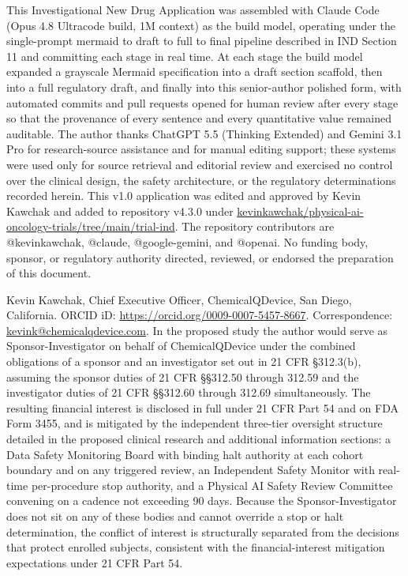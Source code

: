 This Investigational New Drug Application was assembled with Claude Code (Opus 4.8
Ultracode build, 1M context) as the build model, operating under the single-prompt
mermaid to draft to full to final pipeline described in IND Section 11 and committing
each stage in real time. At each stage the build model expanded a grayscale Mermaid
specification into a draft section scaffold, then into a full regulatory draft, and
finally into this senior-author polished form, with automated commits and pull
requests opened for human review after every stage so that the provenance of every
sentence and every quantitative value remained auditable. The author thanks
ChatGPT 5.5 (Thinking Extended) and Gemini 3.1 Pro for research-source assistance
and for manual editing support; these systems were used only for source retrieval
and editorial review and exercised no control over the clinical design, the safety
architecture, or the regulatory determinations recorded herein. This v1.0
application was edited and approved by Kevin Kawchak and added to repository
v4.3.0 under
\href{https://github.com/kevinkawchak/physical-ai-oncology-trials/tree/main/trial-ind}{kevinkawchak/physical-ai-oncology-trials/tree/main/trial-ind}.
The repository contributors are @kevinkawchak, @claude, @google-gemini, and
@openai. No funding body, sponsor, or regulatory authority directed, reviewed, or
endorsed the preparation of this document.

Kevin Kawchak, Chief Executive Officer, ChemicalQDevice, San Diego, California.
ORCID iD:
\href{https://orcid.org/0009-0007-5457-8667}{https://orcid.org/0009-0007-5457-8667}.
Correspondence: \href{mailto:kevink@chemicalqdevice.com}{kevink@chemicalqdevice.com}.
In the proposed study the author would serve as Sponsor-Investigator on behalf of
ChemicalQDevice under the combined obligations of a sponsor and an investigator set
out in 21 CFR \S 312.3(b), assuming the sponsor duties of 21 CFR \S\S 312.50 through
312.59 and the investigator duties of 21 CFR \S\S 312.60 through 312.69
simultaneously. The resulting financial interest is disclosed in full under
21 CFR Part 54 and on FDA Form 3455, and is mitigated by the independent three-tier
oversight structure detailed in the proposed clinical research and additional
information sections: a Data Safety Monitoring Board with binding halt authority at
each cohort boundary and on any triggered review, an Independent Safety Monitor with
real-time per-procedure stop authority, and a Physical AI Safety Review Committee
convening on a cadence not exceeding 90 days. Because the Sponsor-Investigator does
not sit on any of these bodies and cannot override a stop or halt determination, the
conflict of interest is structurally separated from the decisions that protect
enrolled subjects, consistent with the financial-interest mitigation expectations
under 21 CFR Part 54.

